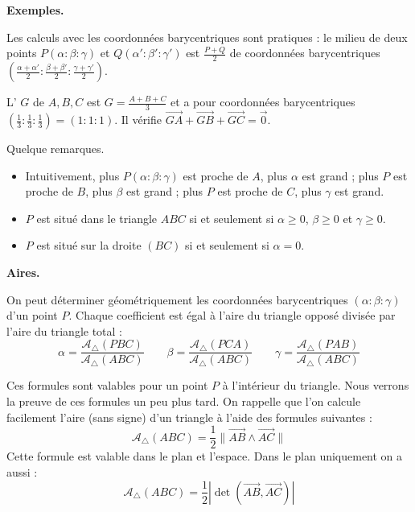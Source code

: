 \documentclass[11pt,class=report,crop=false]{standalone}
\begin{document}
\medskip
\textbf{Exemples.}



Les calculs avec les coordonnées barycentriques sont pratiques : le milieu de deux points $P(\alpha:\beta:\gamma)$
et $Q(\alpha':\beta':\gamma')$ est $\frac{P+Q}{2}$ de coordonnées barycentriques $(\frac{\alpha+\alpha'}{2}:\frac{\beta+\beta'}{2} :\frac{\gamma+\gamma'}{2})$.

L' $G$ de $A, B, C$ est $G = \frac{A+B+C}{3}$ et a pour coordonnées barycentriques $(\frac13:\frac13:\frac13) = (1:1:1)$.
Il vérifie $\vec{GA} + \vec{GB} + \vec{GC} = \vec{0}$.

Quelque remarques.
\begin{itemize}
	\item Intuitivement, plus $P(\alpha:\beta:\gamma)$ est proche de $A$, plus $\alpha$ est grand ; plus $P$ est proche de $B$, plus $\beta$ est grand ; plus $P$ est proche de $C$, plus $\gamma$ est grand.
	\item $P$ est situé dans le triangle $ABC$ si et seulement si $\alpha\ge0$, $\beta\ge0$ et $\gamma\ge0$.
	\item $P$ est situé sur la droite $(BC)$ si et seulement si $\alpha=0$.
\end{itemize}


\medskip
\textbf{Aires.}

On peut déterminer géométriquement les coordonnées barycentriques $(\alpha:\beta:\gamma)$ d'un point $P$.
Chaque coefficient est égal à l'aire du triangle opposé divisée par l'aire du triangle total :
$$\alpha = \frac{\mathcal{A}_{\triangle}(PBC)}{\mathcal{A}_{\triangle}(ABC)}
\qquad
\beta = \frac{\mathcal{A}_{\triangle}(PCA)}{\mathcal{A}_{\triangle}(ABC)}
\qquad
\gamma = \frac{\mathcal{A}_{\triangle}(PAB)}{\mathcal{A}_{\triangle}(ABC)}$$





Ces formules sont valables pour un point $P$ à l'intérieur du triangle. Nous verrons la preuve de ces formules un peu plus tard.
On rappelle que l'on calcule facilement l'aire (sans signe) d'un triangle à l'aide des formules suivantes :
$$\mathcal{A}_{\triangle} (ABC) 
= \frac12 \| \vec{AB} \wedge \vec{AC} \|$$
Cette formule est valable dans le plan et l'espace.
Dans le plan uniquement on a aussi :
$$\mathcal{A}_{\triangle} (ABC) = \frac12 \left| \det(\vec{AB}, \vec{AC}) \right|$$
\end{document}
